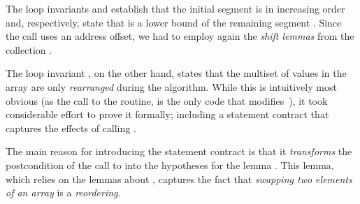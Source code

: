 

The loop invariants  and  establish that the
initial segment  is in increasing order and, respectively,
state that  is a lower bound of the remaining segment .
Since the \minelement call uses an address offset, we had
to employ again the \emph{shift lemmas} from the collection .

The loop invariant , on the other hand, states that the multiset of values in the
array  are only \emph{rearranged} during the algorithm.
%
While this is intuitively most obvious (as the call to the 
routine, is the only code that modifies~),
it took considerable effort to prove it formally; including a statement contract
that captures the effects of calling \swap.

The main reason for introducing the statement contract is that it
\emph{transforms} the postcondition of the call to 
into the hypotheses for the lemma .
This lemma, which relies on the lemmas about ,
captures the fact that \emph{swapping two elements of an array} is a \emph{reordering}.

\clearpage

